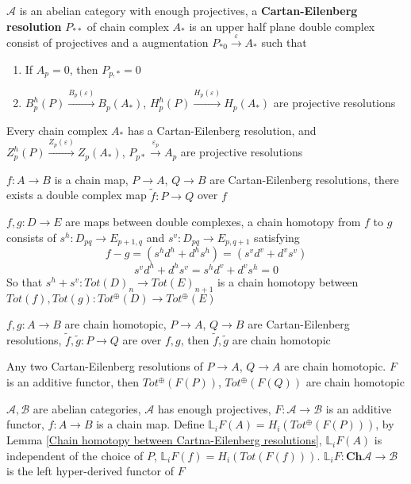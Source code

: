 \documentclass[../main.tex]{subfiles}
\begin{document}
\begin{definition}
$\mathcal A$ is an abelian category with enough projectives, a \textbf{Cartan-Eilenberg resolution} $P_{**}$ of chain complex $A_*$ is an upper half plane double complex consist of projectives and a augmentation $P_{*0}\xrightarrow\varepsilon A_*$ such that
\begin{enumerate}[label=\arabic*., leftmargin=*]
\item If $A_p=0$, then $P_{p,*}=0$
\item $B^h_p(P)\xrightarrow{B_p(\varepsilon)} B_p(A_*)$, $H^h_p(P)\xrightarrow{H_p(\varepsilon)} H_p(A_*)$ are projective resolutions
\end{enumerate}
\end{definition}

\begin{lemma}
Every chain complex $A_*$ has a Cartan-Eilenberg resolution, and $Z^h_p(P)\xrightarrow{Z_p(\varepsilon)} Z_p(A_*)$, $P_{p*}\xrightarrow{\varepsilon_p} A_p$ are projective resolutions
\end{lemma}

\begin{lemma}
$f:A\to B$ is a chain map, $P\to A$, $Q\to B$ are Cartan-Eilenberg resolutions, there exists a double complex map $\widetilde f:P\to Q$ over $f$
\end{lemma}

\begin{definition}
$f,g:D\to E$ are maps between double complexes, a chain homotopy from $f$ to $g$ consists of $s^h:D_{pq}\to E_{p+1,q}$ and $s^v:D_{pq}\to E_{p,q+1}$ satisfying
\[f-g=(s^hd^h+d^hs^h)=(s^vd^v+d^vs^v)\]
\[s^vd^h+d^hs^v=s^hd^v+d^vs^h=0\]
So that $s^h+s^v:Tot(D)_n\to Tot(E)_{n+1}$ is a chain homotopy between $Tot(f),Tot(g):Tot^\oplus(D)\to Tot^\oplus(E)$
\end{definition}

\begin{lemma}\label{Chain homotopy between Cartna-Eilenberg resolutions}
$f,g:A\to B$ are chain homotopic, $P\to A$, $Q\to B$ are Cartan-Eilenberg resolutions, $\tilde f,\tilde g:P\to Q$ are over $f,g$, then $\tilde f,\tilde g$ are chain homotopic \par
Any two Cartan-Eilenberg resolutions of $P\to A$, $Q\to A$ are chain homotopic. $F$ is an additive functor, then $Tot^\oplus(F(P))$, $Tot^\oplus(F(Q))$ are chain homotopic
\end{lemma}

\begin{definition}
$\mathcal A,\mathcal B$ are abelian categories, $\mathcal A$ has enough projectives, $F:\mathcal A\to\mathcal B$ is an additive functor, $f:A\to B$ is a chain map. Define $\mathbb L_iF(A)=H_i(Tot^\oplus(F(P)))$, by Lemma \ref{Chain homotopy between Cartna-Eilenberg resolutions}, $\mathbb L_iF(A)$ is independent of the choice of $P$, $\mathbb L_iF(f)=H_i(Tot(F(f)))$. $\mathbb L_iF:\mathbf{Ch}\mathcal A\to \mathcal B$ is the left hyper-derived functor of $F$
\end{definition}
\end{document}
